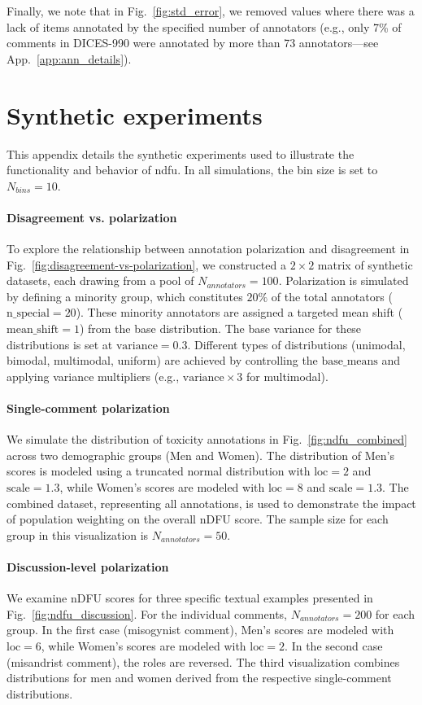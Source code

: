 \documentclass{article} %
\theoremstyle{definition}
\theoremstyle{plain}
\begin{document}
Finally, we note that in Fig.~\ref{fig:std_error}, we removed values where there was a lack of items annotated by the specified number of annotators (e.g., only 7\% of comments in DICES-990 were annotated by more than 73 annotators---see App.~\ref{app:ann_details}).


\section{Synthetic experiments}
\label{app:experiments}

This appendix details the synthetic experiments used to illustrate the functionality and behavior of \ac{ndfu}. In all simulations, the bin size is set to $N_{bins}=10$.

\paragraph{Disagreement vs. polarization}
To explore the relationship between annotation polarization and disagreement in Fig.~\ref{fig:disagreement-vs-polarization}, we constructed a $2 \times 2$ matrix of synthetic datasets, each drawing from a pool of $N_{annotators}=100$. Polarization is simulated by defining a minority group, which constitutes $20\%$ of the total annotators ($\text{n\_special}=20$). These minority annotators are assigned a targeted mean shift ($\text{mean\_shift}=1$) from the base distribution. The base variance for these distributions is set at $\text{variance}=0.3$. Different types of distributions (unimodal, bimodal, multimodal, uniform) are achieved by controlling the $\text{base\_means}$ and applying variance multipliers (e.g., $\text{variance} \times 3$ for multimodal).

\paragraph{Single-comment polarization}
We simulate the distribution of toxicity annotations in Fig.~\ref{fig:ndfu_combined} across two demographic groups (Men and Women). The distribution of Men's scores is modeled using a truncated normal distribution with $\text{loc}=2$ and $\text{scale}=1.3$, while Women's scores are modeled with $\text{loc}=8$ and $\text{scale}=1.3$. The combined dataset, representing all annotations, is used to demonstrate the impact of population weighting on the overall nDFU score. The sample size for each group in this visualization is $N_{annotators}=50$.

\paragraph{Discussion-level polarization}
We examine nDFU scores for three specific textual examples presented in Fig.~\ref{fig:ndfu_discussion}. For the individual comments, $N_{annotators}=200$ for each group. In the first case (misogynist comment), Men's scores are modeled with $\text{loc}=6$, while Women's scores are modeled with $\text{loc}=2$. In the second case (misandrist comment), the roles are reversed. The third visualization combines distributions for men and women derived from the respective single-comment distributions.
\end{document}
